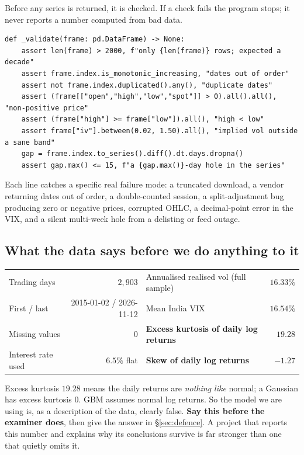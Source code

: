 \documentclass[11pt,a4paper]{article}
\begin{document}
Before any series is returned, it is checked. If a check fails the program stops; it never
reports a number computed from bad data.

\begin{lstlisting}[style=py]
def _validate(frame: pd.DataFrame) -> None:
    assert len(frame) > 2000, f"only {len(frame)} rows; expected a decade"
    assert frame.index.is_monotonic_increasing, "dates out of order"
    assert not frame.index.duplicated().any(), "duplicate dates"
    assert (frame[["open","high","low","spot"]] > 0).all().all(), "non-positive price"
    assert (frame["high"] >= frame["low"]).all(), "high < low"
    assert frame["iv"].between(0.02, 1.50).all(), "implied vol outside a sane band"
    gap = frame.index.to_series().diff().dt.days.dropna()
    assert gap.max() <= 15, f"a {gap.max()}-day hole in the series"
\end{lstlisting}

Each line catches a specific real failure mode: a truncated download, a vendor returning dates
out of order, a double-counted session, a split-adjustment bug producing zero or negative
prices, corrupted OHLC, a decimal-point error in the VIX, and a silent multi-week hole from a
delisting or feed outage.

\subsection{What the data says before we do anything to it}

\begin{table}[H]
\centering\small
\begin{tabular}{lr@{\qquad}lr}
\toprule
Trading days & $2{,}903$ & Annualised realised vol (full sample) & $16.33\%$ \\
First / last & 2015-01-02 / 2026-11-12 & Mean India VIX & $16.54\%$ \\
Missing values & $0$ & \textbf{Excess kurtosis of daily log returns} & $\mathbf{19.28}$ \\
Interest rate used & $6.5\%$ flat & \textbf{Skew of daily log returns} & $\mathbf{-1.27}$ \\
\bottomrule
\end{tabular}
\end{table}

\begin{trapbox}
Excess kurtosis $19.28$ means the daily returns are \emph{nothing like} normal; a Gaussian has
excess kurtosis $0$. GBM assumes normal log returns. So the model we are using is, as a
description of the data, clearly false. \textbf{Say this before the examiner does}, then give
the answer in \S\ref{sec:defence}. A project that reports this number and explains why its
conclusions survive is far stronger than one that quietly omits it.
\end{trapbox}
\end{document}
